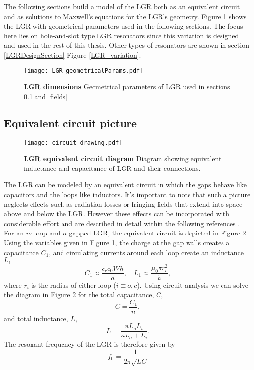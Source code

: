 The following sections build a model of the LGR both as an equivalent circuit and as solutions to Maxwell's equations for the LGR's geometry. Figure \ref{LGR_geometry1} shows the LGR with geometrical parameters used in the following sections. The focus here lies on hole-and-slot type LGR resonators since this variation is designed and used in the rest of this thesis. Other types of resonators are shown in section \ref{LGRDesignSection} Figure \ref{LGR_variation}.


\begin{figure}[h!]
\centering
\texttt{[image: LGR\_geometricalParams.pdf]}  
\caption{\textbf{LGR dimensions} Geometrical parameters of LGR used in sections \ref{circuit} and \ref{fields}}
\label{LGR_geometry1}
\end{figure}


\subsection{Equivalent circuit picture} \label{circuit}

\begin{figure}[t!]
\centering
\texttt{[image: circuit\_drawing.pdf]}  
\caption{\textbf{LGR equivalent circuit diagram} Diagram showing equivalent inductance and capacitance of LGR and their connections.}
\label{circuitdiagram}
\end{figure}

The LGR can be modeled by an equivalent circuit in which the gaps behave like capacitors and the loops like inductors. It's important to note that such a picture neglects effects such as radiation losses or fringing fields that extend into space above and below the LGR. However these effects can be incorporated with considerable effort and are described in detail within the following references \cite{mehdizadeh1983Loop, rinard2005loopgap, wood1984loop}. For an $m$ loop and $n$ gapped LGR, the equivalent circuit is depicted in Figure \ref{circuitdiagram}. Using the variables given in Figure \ref{LGR_geometry1}, the charge at the gap walls creates a capacitance $C_1$, and circulating currents around each loop create an inductance $L_1$
\begin{equation} \label{indcap}
C_1 \approx \frac{\epsilon_r \epsilon_0 W h}{a}, \quad L_1 \approx \frac{\mu_0 \pi r_i^2}{h}, 
\end{equation}
where $r_i$ is the radius of either loop ($i \equiv o,c$). Using circuit analysis we can solve the diagram in Figure \ref{circuitdiagram} for the total capacitance, $C$,
\begin{equation}\label{capacitance}
C = \frac{C_1}{n},
\end{equation} 
and total inductance, $L$,
\begin{equation}\label{inductance}
L = \frac{n L_o L_i}{n L_o + L_i}.
\end{equation}
The resonant frequency of the LGR is therefore given by 
\begin{equation}
f_0 = \frac{1}{2 \pi \sqrt{LC}}
\end{equation}



